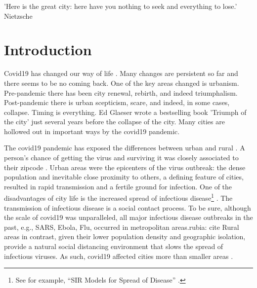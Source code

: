 \documentclass[10pt, letterpaper]{article}
\begin{document}
\begin{spacing}{1.4}

'Here is the great city: here have you nothing to seek and everything to lose.' Nietzsche\\

\section{Introduction} 


Covid19 has changed our way of life \citep{olasov22}. Many changes are persistent so far
   and there seems to be no coming back. One of the key areas
  changed is urbanism. Pre-pandemic there has been city renewal, rebirth, and indeed
  triumphalism. Post-pandemic there is urban scepticism, scare, and indeed, in
  some cases, collapse. 
Timing is everything. Ed Glaeser wrote a bestselling book 'Triumph of the city'
\citep{peck16} just several years before the collapse of the city. Many cities are hollowed out in important ways by the covid19 pandemic.


The covid19 pandemic %
 has exposed the differences between urban and rural %
. %
 A person's chance of getting the virus and surviving it was closely associated to their zipcode \citep{chen2021}. Urban areas were the epicenters of the virus outbreak: the dense population and inevitable close proximity to others, a defining feature of cities, resulted in rapid transmission and a fertile ground for infection. %
 One of the disadvantages of city life is the increased spread of infectious
 disease\footnote{See for example, ``SIR Models for Spread of Disease'' \citep{newman2002spread,cooper2020sir}. } \citep{bettencourt10,bettencourt07}. %
The transmission of infectious disease is a social contact process. To be sure,
although the scale of covid19 was unparalleled, all major infectious disease
outbreaks in the past, e.g., SARS, Ebola, Flu, occurred in metropolitan
areas.{\color{red}rubia: cite}  Rural areas in contrast, given their lower population density and geographic isolation, provide a natural social distancing environment that slows the spread of infectious viruses. As such, covid19 affected cities more than smaller areas \citep{stier2021early}.



\end{spacing}
\end{document}
